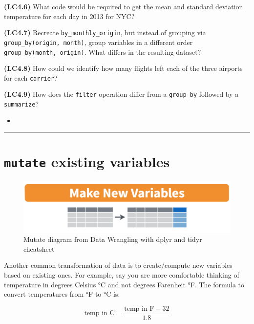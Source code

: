 \documentclass[12pt, krantz2,]{krantz}
\newenvironment{rmdblock}[1]
  {\begin{shaded*}
  \begin{itemize}
  \renewcommand{\labelitemi}{
    \raisebox{-.7\height}[0pt][0pt]{
    }
  }
  \item
  }
  {
  \end{itemize}
  \end{shaded*}
  }
\newenvironment{learncheck}
  {\begin{rmdblock}{warning}}
  {\end{rmdblock}}
\begin{document}
\textbf{(LC4.6)} What code would be required to get the mean and standard deviation temperature for each day in 2013 for NYC?

\textbf{(LC4.7)} Recreate \texttt{by\_monthly\_origin}, but instead of grouping via \texttt{group\_by(origin,\ month)}, group variables in a different order \texttt{group\_by(month,\ origin)}. What differs in the resulting dataset?

\textbf{(LC4.8)} How could we identify how many flights left each of the three airports for each \texttt{carrier}?

\textbf{(LC4.9)} How does the \texttt{filter} operation differ from a \texttt{group\_by} followed by a \texttt{summarize}?

\begin{learncheck}

\end{learncheck}

\begin{center}\rule{0.5\linewidth}{\linethickness}\end{center}

\hypertarget{mutate}{%
\section{\texorpdfstring{\texttt{mutate} existing variables}{mutate existing variables}}\label{mutate}}

\begin{figure}

{\centering \includegraphics[width=\textwidth]{images/mutate} 

}

\caption{Mutate diagram from Data Wrangling with dplyr and tidyr cheatsheet}\label{fig:select}
\end{figure}

Another common transformation of data is to create/compute new variables based on existing ones. For example, say you are more comfortable thinking of temperature in degrees Celsius °C and not degrees Farenheit °F. The formula to convert temperatures from °F to °C is:

\[
\text{temp in C} = \frac{\text{temp in F} - 32}{1.8}
\]
\end{document}
